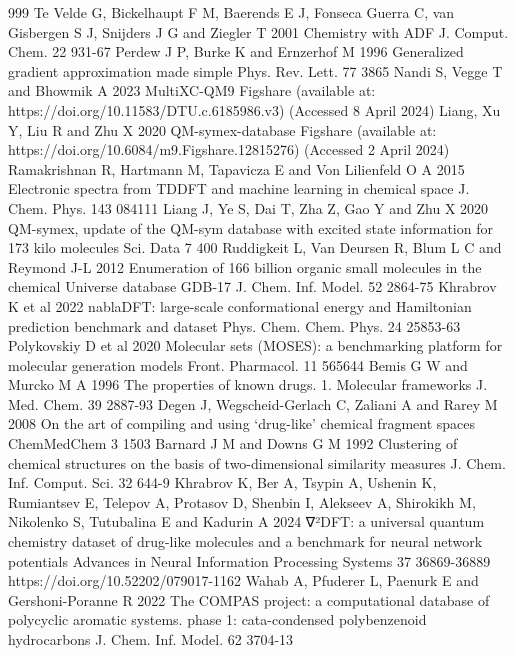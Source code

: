 \documentclass[12pt]{article}
\begin{document}
\begin{thebibliography}{999}
 Te Velde G, Bickelhaupt F M, Baerends E J, Fonseca Guerra C, van Gisbergen S J, Snijders J G and Ziegler T 2001 Chemistry with ADF J. Comput. Chem. 22 931-67
 Perdew J P, Burke K and Ernzerhof M 1996 Generalized gradient approximation made simple Phys. Rev. Lett. 77 3865
 Nandi S, Vegge T and Bhowmik A 2023 MultiXC-QM9 Figshare (available at: https://doi.org/10.11583/DTU.c.6185986.v3) (Accessed 8 April 2024)
 Liang, Xu Y, Liu R and Zhu X 2020 QM-symex-database Figshare (available at: https://doi.org/10.6084/m9.Figshare.12815276) (Accessed 2 April 2024)
 Ramakrishnan R, Hartmann M, Tapavicza E and Von Lilienfeld O A 2015 Electronic spectra from TDDFT and machine learning in chemical space J. Chem. Phys. 143 084111
 Liang J, Ye S, Dai T, Zha Z, Gao Y and Zhu X 2020 QM-symex, update of the QM-sym database with excited state information for 173 kilo molecules Sci. Data 7 400
 Ruddigkeit L, Van Deursen R, Blum L C and Reymond J-L 2012 Enumeration of 166 billion organic small molecules in the chemical Universe database GDB-17 J. Chem. Inf. Model. 52 2864-75
 Khrabrov K et al 2022 nablaDFT: large-scale conformational energy and Hamiltonian prediction benchmark and dataset Phys. Chem. Chem. Phys. 24 25853-63
 Polykovskiy D et al 2020 Molecular sets (MOSES): a benchmarking platform for molecular generation models Front. Pharmacol. 11 565644
 Bemis G W and Murcko M A 1996 The properties of known drugs. 1. Molecular frameworks J. Med. Chem. 39 2887-93
 Degen J, Wegscheid-Gerlach C, Zaliani A and Rarey M 2008 On the art of compiling and using `drug-like' chemical fragment spaces ChemMedChem 3 1503
 Barnard J M and Downs G M 1992 Clustering of chemical structures on the basis of two-dimensional similarity measures J. Chem. Inf. Comput. Sci. 32 644-9
 Khrabrov K, Ber A, Tsypin A, Ushenin K, Rumiantsev E, Telepov A, Protasov D, Shenbin I, Alekseev A, Shirokikh M, Nikolenko S, Tutubalina E and Kadurin A 2024 ∇²DFT: a universal quantum chemistry dataset of drug-like molecules and a benchmark for neural network potentials Advances in Neural Information Processing Systems 37 36869-36889 https://doi.org/10.52202/079017-1162
 Wahab A, Pfuderer L, Paenurk E and Gershoni-Poranne R 2022 The COMPAS project: a computational database of polycyclic aromatic systems. phase 1: cata-condensed polybenzenoid hydrocarbons J. Chem. Inf. Model. 62 3704-13

\end{thebibliography}
\end{document}
